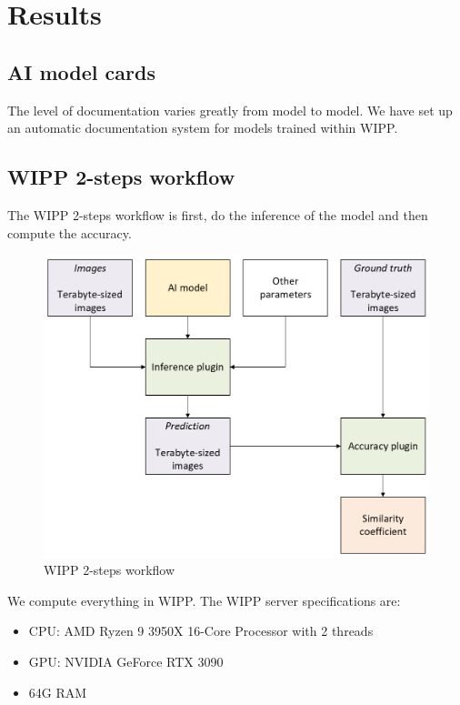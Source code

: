 \section{Results}
\label{sec:results}

\subsection{AI model cards}

The level of documentation varies greatly from model to model. We have set up an
automatic documentation system for models trained within WIPP.

\subsection{WIPP 2-steps workflow}

The WIPP 2-steps workflow is first, do the inference of the model and then
compute the accuracy.

\begin{figure}[H]
  \centering
  \includegraphics[width=1.0\linewidth]{png/results/workflow.png}
  \caption{WIPP 2-steps workflow}
  \label{fig:workflow}
\end{figure}

We compute everything in WIPP. The WIPP server specifications are:
\begin{itemize}
  \item CPU: AMD Ryzen 9 3950X 16-Core Processor with 2 threads
  \item GPU: NVIDIA GeForce RTX 3090
  \item 64G RAM
\end{itemize}

